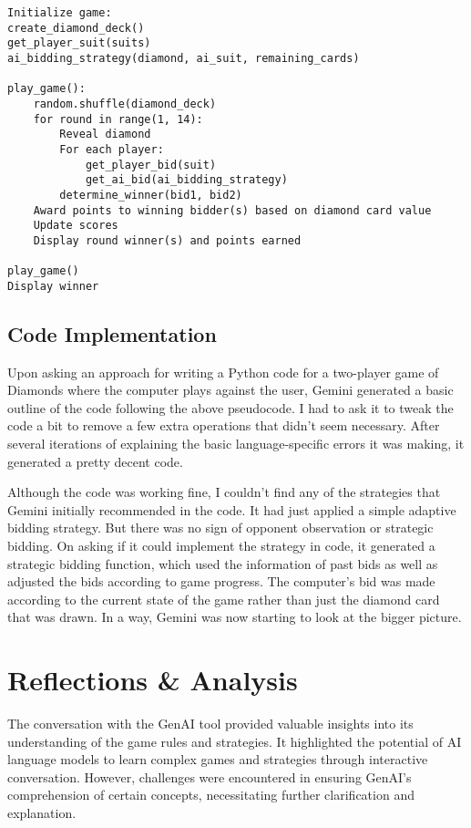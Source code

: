 \documentclass{article}
\begin{document}
\begin{verbatim}
Initialize game: 
create_diamond_deck()
get_player_suit(suits)
ai_bidding_strategy(diamond, ai_suit, remaining_cards)

play_game():
    random.shuffle(diamond_deck) 
    for round in range(1, 14):
        Reveal diamond
        For each player: 
            get_player_bid(suit)
            get_ai_bid(ai_bidding_strategy)
        determine_winner(bid1, bid2)
    Award points to winning bidder(s) based on diamond card value 
    Update scores 
    Display round winner(s) and points earned 

play_game()
Display winner
\end{verbatim}
\vspace{5pt}
\subsection{Code Implementation}

Upon asking an approach for writing a Python code for a two-player game of Diamonds where the computer plays against the user, Gemini generated a basic outline of the code following the above pseudocode. I had to ask it to tweak the code a bit to remove a few extra operations that didn’t seem necessary. After several iterations of explaining the basic language-specific errors it was making, it generated a pretty decent code. 
\vspace{10pt}

Although the code was working fine, I couldn’t find any of the strategies that Gemini initially recommended in the code. It had just applied a simple adaptive bidding strategy. But there was no sign of opponent observation or strategic bidding. On asking if it could implement the strategy in code, it generated a strategic bidding function, which used the information of past bids as well as adjusted the bids according to game progress. The computer’s bid was made according to the current state of the game rather than just the diamond card that was drawn. In a way, Gemini was now starting to look at the bigger picture.
\vspace{10pt}

\section{Reflections \& Analysis}

The conversation with the GenAI tool provided valuable insights into its understanding of the game rules and strategies. It highlighted the potential of AI language models to learn complex games and strategies through interactive conversation. However, challenges were encountered in ensuring GenAI’s comprehension of certain concepts, necessitating further clarification and explanation.
\vspace{10pt}
\end{document}
